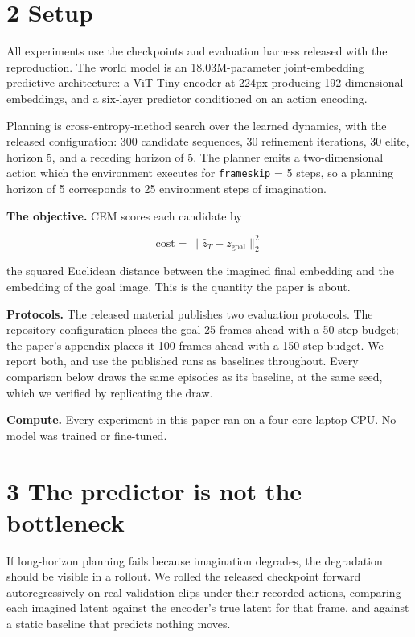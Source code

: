 \documentclass[10pt]{article}
\begin{document}
\section{2 Setup}\label{setup}

All experiments use the checkpoints and evaluation harness released with the
reproduction. The world model is an 18.03M-parameter joint-embedding
predictive architecture: a ViT-Tiny encoder at 224px producing 192-dimensional
embeddings, and a six-layer predictor conditioned on an action encoding.

Planning is cross-entropy-method search over the learned dynamics, with the
released configuration: 300 candidate sequences, 30 refinement iterations, 30
elite, horizon 5, and a receding horizon of 5. The planner emits a
two-dimensional action which the environment executes for \texttt{frameskip} = 5
steps, so a planning horizon of 5 corresponds to 25 environment steps of
imagination.

\textbf{The objective.} CEM scores each candidate by

\[\text{cost} = \lVert \hat{z}_T - z_{\text{goal}} \rVert_2^2\]

the squared Euclidean distance between the imagined final embedding and the
embedding of the goal image. This is the quantity the paper is about.

\textbf{Protocols.} The released material publishes two evaluation protocols. The
repository configuration places the goal 25 frames ahead with a 50-step
budget; the paper's appendix places it 100 frames ahead with a 150-step
budget. We report both, and use the published runs as baselines throughout.
Every comparison below draws the same episodes as its baseline, at the same
seed, which we verified by replicating the draw.

\textbf{Compute.} Every experiment in this paper ran on a four-core laptop CPU. No
model was trained or fine-tuned.

\section{3 The predictor is not the bottleneck}\label{the-predictor-is-not-the-bottleneck}

If long-horizon planning fails because imagination degrades, the degradation
should be visible in a rollout. We rolled the released checkpoint forward
autoregressively on real validation clips under their recorded actions,
comparing each imagined latent against the encoder's true latent for that
frame, and against a static baseline that predicts nothing moves.
\end{document}
